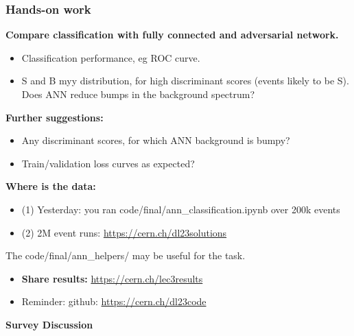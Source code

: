 \documentclass[11pt,xcolor=dvipsnames,aspectratio=169]{beamer}
\begin{document}
\begin{frame}
  \frametitle{\bf Hands-on work}

  {\bf Compare classification with fully connected and adversarial network.}
  \begin{itemize}
  \item Classification performance, eg ROC curve.
  \item S and B myy distribution, for high discriminant scores (events likely to
    be S). Does ANN reduce bumps in the background \myy{} spectrum? 
  \end{itemize}
  {\bf Further suggestions:}
  \begin{itemize}
  \item Any discriminant scores, for which ANN background \myy{} is bumpy?
  \item Train/validation loss curves as expected?
  \end{itemize}
  {\bf Where is the data:} 
  \begin{itemize}
  \item (1) Yesterday: you ran code/final/ann\_classification.ipynb over 200k events
  \item (2) 2M event runs: \href{https://cern.ch/dl23solutions}{\textcolor{EDBBlue}{https://cern.ch/dl23solutions}}
  \end{itemize}
  The code/final/ann\_helpers/ may be useful for the task.
  \begin{itemize}
  \item {\bf Share results:} \href{https://cern.ch/lec3results}{\textcolor{EDBBlue}{https://cern.ch/lec3results}}
  \item Reminder: github: \href{https://cern.ch/dl23code}{\textcolor{EDBBlue}{https://cern.ch/dl23code}}
  \end{itemize}
\end{frame}

{
%
\begin{frame}
  \begin{center}
    \setlength{\parskip}{0pt}
    \vspace{10pt}
    {\Huge\bf Survey Discussion}
  \end{center}
\end{frame}
}
\end{document}
